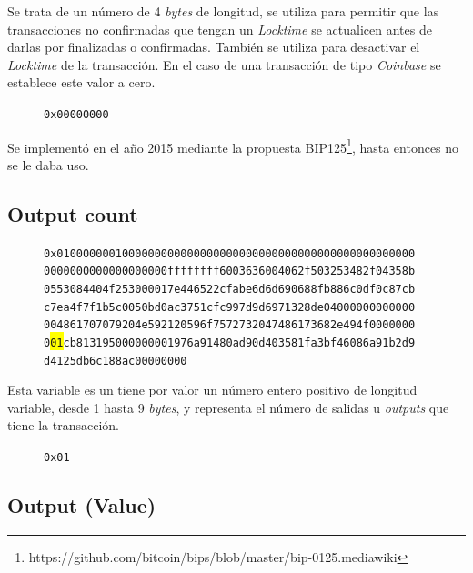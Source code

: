\documentclass{article}
\begin{document}
    Se trata de un número de 4 \textit{bytes} de longitud, se utiliza para permitir que las transacciones no confirmadas que tengan un \textit{Locktime} se actualicen antes de darlas por finalizadas o confirmadas. También se utiliza para desactivar el \textit{Locktime} de la transacción. En el caso de una transacción de tipo \textit{Coinbase} se establece este valor a cero.
    \begin{figure}[H]
        \texttt{0x00000000}
    \end{figure}
    Se implementó en el año 2015 mediante la propuesta BIP125\footnote{https://github.com/bitcoin/bips/blob/master/bip-0125.mediawiki}, hasta entonces no se le daba uso.
    
    \subsection{Output count}
    
    \begin{figure}[H]
        \texttt{0x0100000001000000000000000000000000000000000000000000000} \\
        \texttt{0000000000000000000ffffffff6003636004062f503253482f04358b} \\
        \texttt{0553084404f253000017e446522cfabe6d6d690688fb886c0df0c87cb} \\
        \texttt{c7ea4f7f1b5c0050bd0ac3751cfc997d9d6971328de04000000000000} \\
        \texttt{004861707079204e592120596f7572732047486173682e494f0000000} \\
        \texttt{0\colorbox{Yellow}{01}cb813195000000001976a91480ad90d403581fa3bf46086a91b2d9} \\
        \texttt{d4125db6c188ac00000000}
    \end{figure}
    
    Esta variable es un tiene por valor un número entero positivo de longitud variable, desde 1 hasta 9 \textit{bytes}, y representa el número de salidas u \textit{outputs} que tiene la transacción.
    \begin{figure}[H]
        \texttt{0x01}
    \end{figure}
    
    \subsection{Output (Value)}
    
\end{document}
